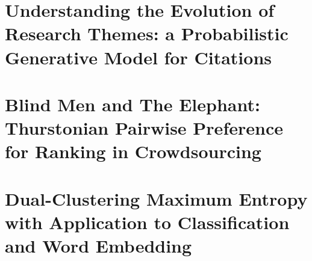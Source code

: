 \documentclass[edeposit,fullpage]{uiucthesis2009}
\theoremstyle{plain}
\theoremstyle{definition}
\theoremstyle{remark}
\newcommand{\DCME}{Dual-Clustering Maximum Entropy}
\begin{document}
\tableofcontents
\listoftables
\listoffigures





\mainmatter




\chapter{Understanding the Evolution of Research Themes:
  a Probabilistic Generative Model for Citations}\label{chp::clda}


\chapter{Blind Men and The Elephant: \\
  Thurstonian Pairwise Preference for Ranking in Crowdsourcing}\label{chp::tpp}







\chapter{\DCME{} \\ with Application to Classification and Word
Embedding}\label{chp::dcme}





\end{document}
